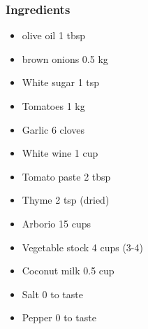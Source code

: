 \documentclass[]{article}
\begin{document}
\subsubsection*{\Large Ingredients}
\begin{multicols}{2}
\begin{itemize}
 \item olive oil \hfill 1 tbsp
 \item brown onions \hfill 0.5 kg
 \item White sugar \hfill 1 tsp
 \item Tomatoes \hfill 1 kg
 \item Garlic \hfill 6 cloves
 \item White wine \hfill 1 cup
 \item Tomato paste \hfill 2 tbsp
 \item Thyme \hfill 2 tsp (dried)
 \item Arborio \hfill 15 cups
 \item Vegetable stock \hfill 4 cups (3-4)
 \item Coconut milk \hfill 0.5 cup
 \item Salt \hfill 0 to taste
 \item Pepper \hfill 0 to taste
\end{itemize}
\end{multicols}
\end{document}
